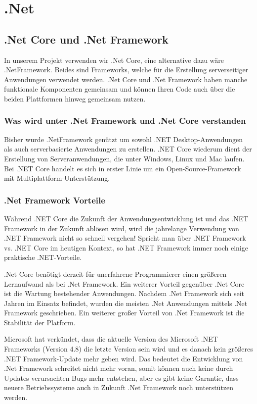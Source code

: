\section{.Net}


\subsection{.Net Core und .Net Framework}

In unserem Projekt verwenden wir .Net Core, eine alternative dazu wäre .NetFramework.
Beides sind Frameworks, welche für die Erstellung serverseitiger Anwendungen verwendet werden. 
.Net Core und .Net Framework haben manche funktionale Komponenten gemeinsam und können Ihren Code auch über die beiden Plattformen hinweg gemeinsam nutzen.

\subsubsection*{ Was wird unter .Net Framework und .Net Core verstanden}
Bisher wurde .NetFramework genützt um sowohl .NET Desktop-Anwendungen als auch serverbasierte Anwendungen zu erstellen.
.NET Core wiederum dient der Erstellung von Serveranwendungen, die unter Windows, Linux und Mac laufen.
Bei .NET Core handelt es sich in erster Linie um ein Open-Source-Framework mit Multiplattform-Unterstützung.
\cite{.NetFrameworkvsCore}

\subsubsection*{.Net Framework Vorteile}
Während .NET Core die Zukunft der Anwendungsentwicklung ist und das .NET Framework in der Zukunft ablösen wird, wird die jahrelange Verwendung von .NET Framework nicht so schnell vergehen!
Spricht man über .NET Framework vs. .NET Core im heutigen Kontext, so hat .NET Framework immer noch einige praktische .NET-Vorteile.

.Net Core benötigt derzeit für unerfahrene Programmierer einen größeren Lernaufwand als bei .Net Framework. 
Ein weiterer Vorteil gegenüber .Net Core ist die Wartung bestehender Anwendungen. 
Nachdem .Net Framework sich seit Jahren im Einsatz befindet, wurden die meisten .Net Anwendungen mittels .Net Framework geschrieben. 
Ein weiterer großer Vorteil von .Net Framework ist die Stabilität der Platform. 

Microsoft hat verkündet, dass die aktuelle Version des Microsoft .NET Frameworks (Version 4.8) die letzte Version sein wird und es danach kein größeres .NET Framework-Update mehr geben wird.
Das bedeutet die Entwicklung von .Net Framework schreitet nicht mehr voran, somit können auch keine durch Updates verursachten Bugs mehr entstehen, aber es gibt keine Garantie, dass neuere 
Betriebssysteme auch in Zukunft .Net Framework noch unterstützen werden. \cite{.NetFramework}

